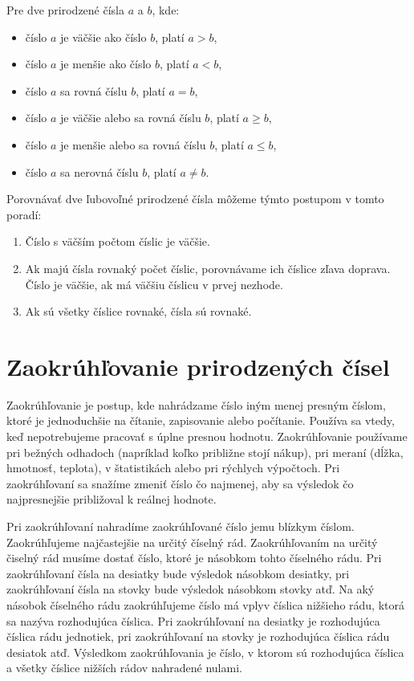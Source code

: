 \documentclass{report}
\begin{document}
Pre dve prirodzené čísla \(a\) a \(b\), kde:
\begin{itemize}
  \item číslo \(a\) je väčšie ako číslo \(b\), platí \(a > b\),
  \item číslo \(a\) je menšie ako číslo \(b\), platí \(a < b\),
  \item číslo \(a\) sa rovná číslu \(b\), platí \(a = b\),
  \item číslo \(a\) je väčšie alebo sa rovná číslu \(b\), platí \(a \geq b\),
  \item číslo \(a\) je menšie alebo sa rovná číslu \(b\), platí \(a \leq b\),
  \item číslo \(a\) sa nerovná číslu \(b\), platí \(a \neq b\).
\end{itemize}
Porovnávať dve ľubovoľné prirodzené čísla môžeme týmto postupom v tomto poradí:
\begin{enumerate}[label=\arabic*)]
  \item Číslo s väčším počtom číslic je väčšie.
  \item Ak majú čísla rovnaký počet číslic, porovnávame ich číslice zľava doprava. Číslo je väčšie, ak má väčšiu číslicu v prvej nezhode.
  \item Ak sú všetky číslice rovnaké, čísla sú rovnaké.
\end{enumerate}

\section{Zaokrúhľovanie prirodzených čísel}

Zaokrúhľovanie je postup, kde nahrádzame číslo iným menej presným číslom, ktoré je jednoduchšie na čítanie, zapisovanie alebo počítanie. Používa sa vtedy, keď nepotrebujeme pracovať s úplne presnou hodnotu. Zaokrúhľovanie používame pri bežných odhadoch (napríklad koľko približne stojí nákup), pri meraní (dĺžka, hmotnosť, teplota), v štatistikách alebo pri rýchlych výpočtoch. Pri zaokrúhľovaní sa snažíme zmeniť číslo čo najmenej, aby sa výsledok čo najpresnejšie približoval k reálnej hodnote.

Pri zaokrúhľovaní nahradíme zaokrúhľované číslo jemu blízkym číslom. Zaokrúhľujeme najčastejšie na určitý číselný rád. Zaokrúhľovaním na určitý čiselný rád musíme dostať číslo, ktoré je násobkom tohto číselného rádu. Pri zaokrúhľovaní čísla na desiatky bude výsledok násobkom desiatky, pri zaokrúhľovaní čísla na stovky bude výsledok násobkom stovky atď. Na aký násobok číselného rádu zaokrúhľujeme číslo má vplyv číslica nižšieho rádu, ktorá sa nazýva rozhodujúca číslica. Pri zaokrúhľovaní na desiatky je rozhodujúca číslica rádu jednotiek, pri zaokrúhľovaní na stovky je rozhodujúca číslica rádu desiatok atď. Výsledkom zaokrúhľovania je číslo, v ktorom sú rozhodujúca číslica a všetky číslice nižších rádov nahradené nulami.
\end{document}
